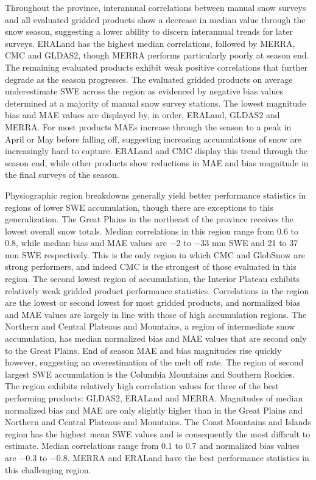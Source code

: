 \documentclass[12pt]{article}
\begin{document}
Throughout the province, interannual correlations between manual snow surveys and all evaluated gridded products show a decrease in median value through the snow season, suggesting a lower ability to discern interannual trends for later surveys.  ERALand has the highest median correlations, followed by MERRA, CMC and GLDAS2, though MERRA performs particularly poorly at season end.  The remaining evaluated products exhibit weak positive correlations that further degrade as the season progresses.  The evaluated gridded products on average underestimate SWE across the region as evidenced by negative bias values determined at a majority of manual snow survey stations.  The lowest magnitude bias and MAE values are displayed by, in order, ERALand, GLDAS2 and MERRA.  For most products MAEs increase through the season to a peak in April or May before falling off, suggesting increasing accumulations of snow are increasingly hard to capture.  ERALand and CMC display this trend through the season end, while other products show reductions in MAE and bias magnitude in the final surveys of the season.

Physiographic region breakdowns generally yield better performance statistics in regions of lower SWE accumulation, though there are exceptions to this generalization.  The Great Plains in the northeast of the province receives the lowest overall snow totals.  Median correlations in this region range from 0.6 to 0.8, while median bias and MAE values are $-$2 to $-$33 mm SWE and 21 to 37 mm SWE respectively.  This is the only region in which CMC and GlobSnow are strong performers, and indeed CMC is the strongest of those evaluated in this region.  The second lowest region of accumulation, the Interior Plateau exhibits relatively weak gridded product performance statistics.  Correlations in the region are the lowest or second lowest for most gridded products, and normalized bias and MAE values are largely in line with those of high accumulation regions.  The Northern and Central Plateaus and Mountains, a region of intermediate snow accumulation, has median normalized bias and MAE values that are second only to the Great Plains.  End of season MAE and bias magnitudes rise quickly however, suggesting an overestimation of the melt off rate.  The region of second largest SWE accumulation is the Columbia Mountains and Southern Rockies.  The region exhibits relatively high correlation values for three of the best performing products: GLDAS2, ERALand and MERRA.  Magnitudes of median normalized bias and MAE are only slightly higher than in the Great Plains and Northern and Central Plateaus and Mountains.  The Coast Mountains and Islands region has the highest mean SWE values and is consequently the most difficult to estimate.  Median correlations range from 0.1 to 0.7 and normalized bias values are $-$0.3 to $-$0.8.  MERRA and ERALand have the best performance statistics in this challenging region. 
\end{document}
